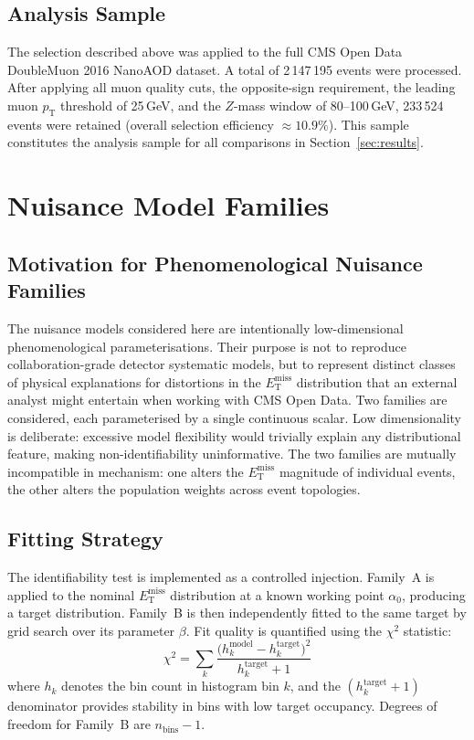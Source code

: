 \documentclass[a4paper,11pt]{article}
\newcommand{\MET}{\ensuremath{E_{\mathrm{T}}^{\mathrm{miss}}}\xspace}
\newcommand{\chisq}{\ensuremath{\chi^2}\xspace}
\begin{document}
\subsection{Analysis Sample}

The selection described above was applied to the full CMS Open Data
DoubleMuon 2016 NanoAOD dataset.
A total of 2\,147\,195 events were processed.
After applying all muon quality cuts, the opposite-sign requirement, the
leading muon $p_{\mathrm{T}}$ threshold of 25\,GeV, and the $Z$-mass window
of 80--100\,GeV, 233\,524 events were retained (overall selection efficiency
$\approx 10.9\%$).
This sample constitutes the analysis sample for all comparisons in
Section~\ref{sec:results}.

\section{Nuisance Model Families}
\label{sec:models}

\subsection{Motivation for Phenomenological Nuisance Families}

The nuisance models considered here are intentionally low-dimensional
phenomenological parameterisations.
Their purpose is not to reproduce collaboration-grade detector systematic
models, but to represent distinct classes of physical explanations for
distortions in the \MET distribution that an external analyst might
entertain when working with CMS Open Data.
Two families are considered, each parameterised by a single continuous
scalar.
Low dimensionality is deliberate: excessive model flexibility would trivially
explain any distributional feature, making non-identifiability uninformative.
The two families are mutually incompatible in mechanism: one alters the \MET
magnitude of individual events, the other alters the population weights
across event topologies.

\subsection{Fitting Strategy}

The identifiability test is implemented as a controlled injection.
Family~A is applied to the nominal \MET distribution at a known working
point $\alpha_0$, producing a target distribution.
Family~B is then independently fitted to the same target by grid search
over its parameter $\beta$.
Fit quality is quantified using the \chisq statistic:
\begin{equation}
  \chi^2 = \sum_k \frac{\bigl(h_k^{\mathrm{model}} -
    h_k^{\mathrm{target}}\bigr)^2}{h_k^{\mathrm{target}} + 1}
  \label{eq:chi2}
\end{equation}
where $h_k$ denotes the bin count in histogram bin $k$, and the
$(h_k^{\mathrm{target}}+1)$ denominator provides stability in bins with low
target occupancy.
Degrees of freedom for Family~B are $n_{\mathrm{bins}} - 1$.
\end{document}
